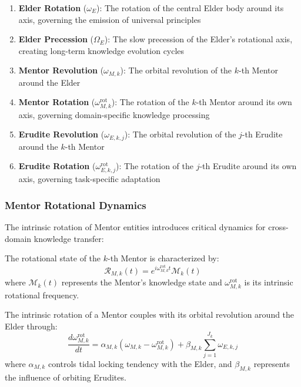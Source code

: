 \begin{enumerate}
    \item \textbf{Elder Rotation} ($\omega_E$): The rotation of the central Elder body around its axis, governing the emission of universal principles
    \item \textbf{Elder Precession} ($\Omega_E$): The slow precession of the Elder's rotational axis, creating long-term knowledge evolution cycles
    \item \textbf{Mentor Revolution} ($\omega_{M,k}$): The orbital revolution of the $k$-th Mentor around the Elder
    \item \textbf{Mentor Rotation} ($\omega_{M,k}^{\text{rot}}$): The rotation of the $k$-th Mentor around its own axis, governing domain-specific knowledge processing
    \item \textbf{Erudite Revolution} ($\omega_{E,k,j}$): The orbital revolution of the $j$-th Erudite around the $k$-th Mentor
    \item \textbf{Erudite Rotation} ($\omega_{E,k,j}^{\text{rot}}$): The rotation of the $j$-th Erudite around its own axis, governing task-specific adaptation
\end{enumerate}

\subsubsection{Mentor Rotational Dynamics}

The intrinsic rotation of Mentor entities introduces critical dynamics for cross-domain knowledge transfer:

\begin{definition}
The rotational state of the $k$-th Mentor is characterized by:
\begin{equation}
\mathcal{R}_{M,k}(t) = e^{i\omega_{M,k}^{\text{rot}} t} \mathcal{M}_k(t)
\end{equation}
where $\mathcal{M}_k(t)$ represents the Mentor's knowledge state and $\omega_{M,k}^{\text{rot}}$ is its intrinsic rotational frequency.
\end{definition}

\begin{theorem}
The intrinsic rotation of a Mentor couples with its orbital revolution around the Elder through:
\begin{equation}
\frac{d\omega_{M,k}^{\text{rot}}}{dt} = \alpha_{M,k} \left(\omega_{M,k} - \omega_{M,k}^{\text{rot}}\right) + \beta_{M,k} \sum_{j=1}^{J_k} \omega_{E,k,j}
\end{equation}
where $\alpha_{M,k}$ controls tidal locking tendency with the Elder, and $\beta_{M,k}$ represents the influence of orbiting Erudites.
\end{theorem}

